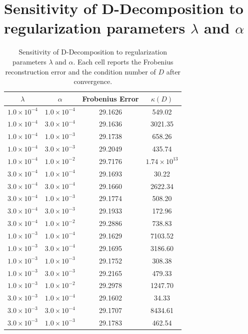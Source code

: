 \documentclass[10pt,a4paper]{article}
\begin{document}
\section{Sensitivity of D-Decomposition to regularization parameters $\lambda$ and $\alpha$}
\begin{table}[H]
\centering
\caption{Sensitivity of D-Decomposition to regularization parameters $\lambda$ and $\alpha$. Each cell reports the Frobenius reconstruction error and the condition number of $D$ after convergence.}
\begin{tabular}{cccc}
\hline
$\lambda$ & $\alpha$ & Frobenius Error & $\kappa(D)$ \\
\hline
$1.0 \times 10^{-4}$ & $1.0 \times 10^{-4}$ & 29.1626 & 549.02 \\
$1.0 \times 10^{-4}$ & $3.0 \times 10^{-4}$ & 29.1636 & 3021.35 \\
$1.0 \times 10^{-4}$ & $1.0 \times 10^{-3}$ & 29.1738 & 658.26 \\
$1.0 \times 10^{-4}$ & $3.0 \times 10^{-3}$ & 29.2049 & 435.74 \\
$1.0 \times 10^{-4}$ & $1.0 \times 10^{-2}$ & 29.7176 & $1.74 \times 10^{13}$ \\
$3.0 \times 10^{-4}$ & $1.0 \times 10^{-4}$ & 29.1693 & 30.22 \\
$3.0 \times 10^{-4}$ & $3.0 \times 10^{-4}$ & 29.1660 & 2622.34 \\
$3.0 \times 10^{-4}$ & $1.0 \times 10^{-3}$ & 29.1774 & 508.20 \\
$3.0 \times 10^{-4}$ & $3.0 \times 10^{-3}$ & 29.1933 & 172.96 \\
$3.0 \times 10^{-4}$ & $1.0 \times 10^{-2}$ & 29.2886 & 738.83 \\
$1.0 \times 10^{-3}$ & $1.0 \times 10^{-4}$ & 29.1629 & 7103.52 \\
$1.0 \times 10^{-3}$ & $3.0 \times 10^{-4}$ & 29.1695 & 3186.60 \\
$1.0 \times 10^{-3}$ & $1.0 \times 10^{-3}$ & 29.1752 & 308.38 \\
$1.0 \times 10^{-3}$ & $3.0 \times 10^{-3}$ & 29.2165 & 479.33 \\
$1.0 \times 10^{-3}$ & $1.0 \times 10^{-2}$ & 29.2978 & 1247.70 \\
$3.0 \times 10^{-3}$ & $1.0 \times 10^{-4}$ & 29.1602 & 34.33 \\
$3.0 \times 10^{-3}$ & $3.0 \times 10^{-4}$ & 29.1707 & 8434.61 \\
$3.0 \times 10^{-3}$ & $1.0 \times 10^{-3}$ & 29.1783 & 462.54 \\

\end{tabular}
\end{table}
\end{document}
